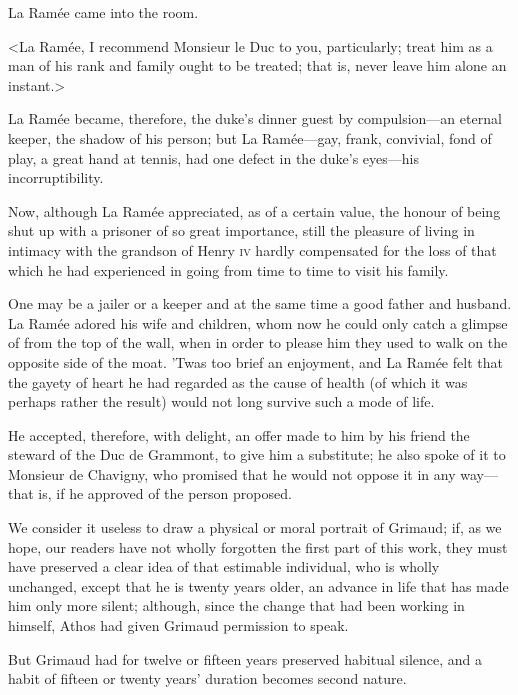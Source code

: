 La Ramée came into the room.

<La Ramée, I recommend Monsieur le Duc to you, particularly; treat him as a man of his rank and family ought to be treated; that is, never leave him alone an instant.>

La Ramée became, therefore, the duke's dinner guest by compulsion—an eternal keeper, the shadow of his person; but La Ramée—gay, frank, convivial, fond of play, a great hand at tennis, had one defect in the duke's eyes—his incorruptibility.

Now, although La Ramée appreciated, as of a certain value, the honour of being shut up with a prisoner of so great importance, still the pleasure of living in intimacy with the grandson of Henry \textsc{iv} hardly compensated for the loss of that which he had experienced in going from time to time to visit his family.

One may be a jailer or a keeper and at the same time a good father and husband. La Ramée adored his wife and children, whom now he could only catch a glimpse of from the top of the wall, when in order to please him they used to walk on the opposite side of the moat. 'Twas too brief an enjoyment, and La Ramée felt that the gayety of heart he had regarded as the cause of health (of which it was perhaps rather the result) would not long survive such a mode of life.

He accepted, therefore, with delight, an offer made to him by his friend the steward of the Duc de Grammont, to give him a substitute; he also spoke of it to Monsieur de Chavigny, who promised that he would not oppose it in any way—that is, if he approved of the person proposed.

We consider it useless to draw a physical or moral portrait of Grimaud; if, as we hope, our readers have not wholly forgotten the first part of this work, they must have preserved a clear idea of that estimable individual, who is wholly unchanged, except that he is twenty years older, an advance in life that has made him only more silent; although, since the change that had been working in himself, Athos had given Grimaud permission to speak.

But Grimaud had for twelve or fifteen years preserved habitual silence, and a habit of fifteen or twenty years' duration becomes second nature. 